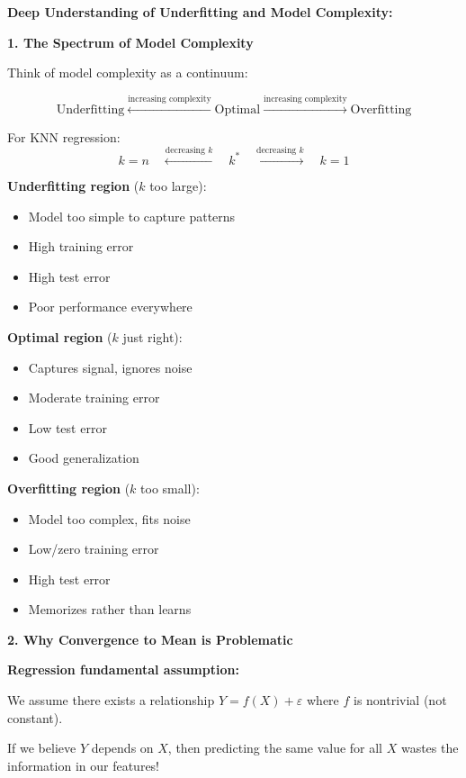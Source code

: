 \documentclass[12pt]{article}
\begin{document}
\begin{explanation}
\textbf{Deep Understanding of Underfitting and Model Complexity:}

\textbf{1. The Spectrum of Model Complexity}

Think of model complexity as a continuum:

\[
\text{Underfitting} \xleftarrow{\text{increasing complexity}} \text{Optimal} \xrightarrow{\text{increasing complexity}} \text{Overfitting}
\]

For KNN regression:
\[
k = n \quad \xleftarrow{\text{decreasing } k} \quad k^* \quad \xrightarrow{\text{decreasing } k} \quad k = 1
\]

\textbf{Underfitting region} (\(k\) too large):
\begin{itemize}
    \item Model too simple to capture patterns
    \item High training error
    \item High test error
    \item Poor performance everywhere
\end{itemize}

\textbf{Optimal region} (\(k\) just right):
\begin{itemize}
    \item Captures signal, ignores noise
    \item Moderate training error
    \item Low test error
    \item Good generalization
\end{itemize}

\textbf{Overfitting region} (\(k\) too small):
\begin{itemize}
    \item Model too complex, fits noise
    \item Low/zero training error
    \item High test error
    \item Memorizes rather than learns
\end{itemize}

\textbf{2. Why Convergence to Mean is Problematic}

\textbf{Regression fundamental assumption:}

We assume there exists a relationship \(Y = f(X) + \varepsilon\) where \(f\) is nontrivial (not constant).

If we believe \(Y\) depends on \(X\), then predicting the same value for all \(X\) wastes the information in our features!


\end{explanation}
\end{document}
